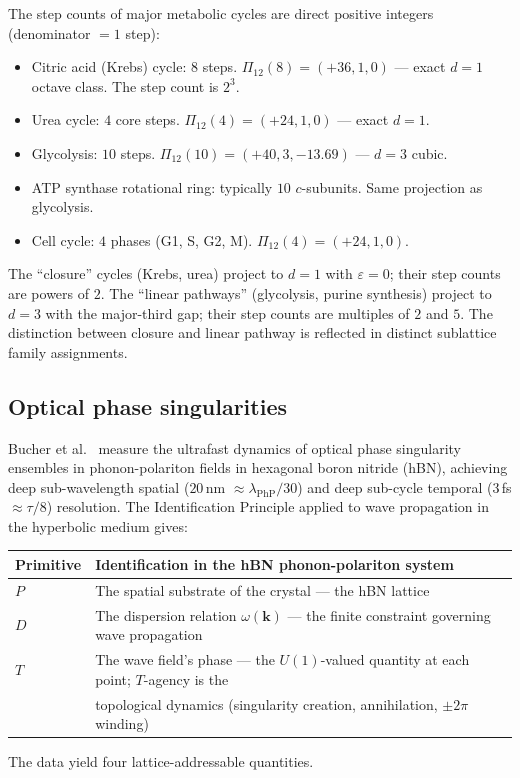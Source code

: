 \documentclass[11pt,a4paper]{article}
\theoremstyle{definition}
\theoremstyle{remark}
\newcommand{\eps}{\varepsilon}
\begin{document}
The step counts of major metabolic cycles are direct positive integers (denominator $=1$ step):
\begin{itemize}[leftmargin=*]
\item Citric acid (Krebs) cycle: $8$ steps. $\Pi_{12}(8) = (+36, 1, 0)$ --- exact $d=1$ octave class. The step count is $2^{3}$.
\item Urea cycle: $4$ core steps. $\Pi_{12}(4) = (+24, 1, 0)$ --- exact $d=1$.
\item Glycolysis: $10$ steps. $\Pi_{12}(10) = (+40, 3, -13.69)$ --- $d=3$ cubic.
\item ATP synthase rotational ring: typically $10$ $c$-subunits. Same projection as glycolysis.
\item Cell cycle: $4$ phases (G1, S, G2, M). $\Pi_{12}(4) = (+24, 1, 0)$.
\end{itemize}

The ``closure'' cycles (Krebs, urea) project to $d=1$ with $\eps=0$; their step counts are powers of $2$. The ``linear pathways'' (glycolysis, purine synthesis) project to $d=3$ with the major-third gap; their step counts are multiples of $2$ and $5$. The distinction between closure and linear pathway is reflected in distinct sublattice family assignments.

\subsection{Optical phase singularities}\label{subsec:optical-singularities}

Bucher et al.~\cite{Bucher2025} measure the ultrafast dynamics of optical phase singularity ensembles in phonon-polariton fields in hexagonal boron nitride (hBN), achieving deep sub-wavelength spatial ($20$\,nm $\approx \lambda_{\mathrm{PhP}}/30$) and deep sub-cycle temporal ($3$\,fs $\approx \tau/8$) resolution. The Identification Principle applied to wave propagation in the hyperbolic medium gives:
\begin{center}
\begin{tabular}{@{}l l@{}}
\toprule
Primitive & Identification in the hBN phonon-polariton system\\
\midrule
$P$ & The spatial substrate of the crystal --- the hBN lattice\\
$D$ & The dispersion relation $\omega(\mathbf{k})$ --- the finite constraint governing wave propagation\\
$T$ & The wave field's phase --- the $U(1)$-valued quantity at each point; $T$-agency is the\\
    & topological dynamics (singularity creation, annihilation, $\pm 2\pi$ winding)\\
\bottomrule
\end{tabular}
\end{center}
The data yield four lattice-addressable quantities.
\end{document}
